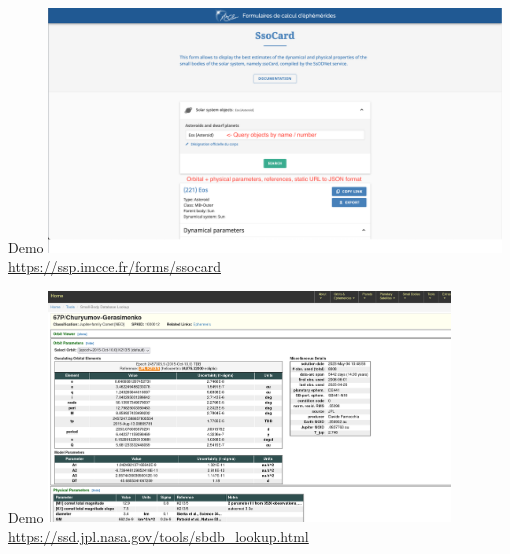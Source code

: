 \begin{frame}[t]{Demo}
  \includegraphics[width=0.9\textwidth]{gfx/demo_ssocard.png}
  \url{https://ssp.imcce.fr/forms/ssocard}
\end{frame}

\begin{frame}[t]{Demo}
  \includegraphics[width=0.8\textwidth]{gfx/demo_jpl.png}
  \url{https://ssd.jpl.nasa.gov/tools/sbdb_lookup.html}
\end{frame}

%

